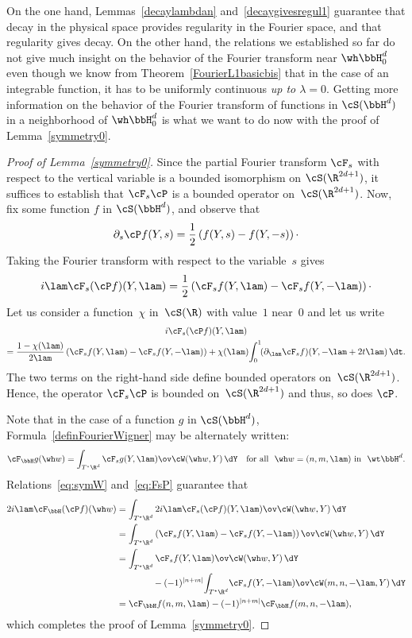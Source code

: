 On the one hand, Lemmas~\ref{decaylambdan} and~\ref{decaygivesregul1} guarantee that decay in the physical space provides regularity in the Fourier space, and that regularity gives decay. On the other hand, the relations we established so far do not give much insight on the behavior of the Fourier transform near $\wh\bbH_0^d$ even though we know from Theorem~\ref{FourierL1basicbis} that in the case of an integrable function, it has to be uniformly continuous \emph{up to $\lambda=0$}. Getting more information on the behavior of the Fourier transform of functions in $\cS(\bbH^d)$ in a neighborhood of $\wh\bbH_0^d$ is what we want to do now with the proof of Lemma~\ref{symmetry0}.

\begin{proof}[Proof of Lemma~\ref{symmetry0}]
Since the partial Fourier transform $\cF_s$ with respect to the vertical variable is a bounded isomorphism on $\cS(\R^{2d+1})$, it suffices to establish that $\cF_s\cP$ is a bounded operator on~$\cS(\R^{2d+1})$. Now, fix some function $f$ in $\cS(\bbH^d)$, and observe that
\[
\partial_s \cP f (Y,s) = \frac 12 \left(f(Y,s) -f(Y,-s)\right)\cdotp
\]
Taking the Fourier transform with respect to the variable~$s$ gives
\begin{equation}\label{eq:FsP}
i\lam \cF_s (\cP f)(Y,\lam) = \frac 12 \left(\cF_sf(Y,\lam) -\cF_sf(Y,-\lam)\right)\cdotp
\end{equation}
Let us consider a function~$\chi$ in~$\cS(\R)$ with value~$1$ near~$0$ and let us write
\begin{multline*}
i \cF_s (\cP f)(Y,\lam)\\ = \frac {1-\chi(\lam)} {2\lam} \left(\cF_sf(Y,\lam) -\cF_sf(Y,-\lam)\right) +\chi(\lam)\! \int_0^1 \!(\partial_\lam\cF_sf) (Y, -\lam+2t\lam)\,\dt.
\end{multline*}
The two terms on the right-hand side define bounded operators on~$\cS(\R^{2d+1})$. Hence, the operator $\cF_s\cP$ is bounded on~$\cS(\R^{2d+1})$ and thus, so does $\cP$.

Note that in the case of a function $g$ in $\cS(\bbH^d)$, Formula~\eqref{definFourierWigner} may be alternately written:
\[
\cF_\bbH g(\wh w)=\int_{T^\star\R^d} \cF_sg(Y,\lam)\ov\cW(\wh w,Y)\,\dY\quad\hbox{for all }\ \wh w=(n,m,\lam)
\hbox{ in }\ \wt\bbH^d.
\]
Relations~\eqref{eq:symW} and~\eqref{eq:FsP} guarantee that
\[
\begin{aligned}
2 i\lam \cF_\bbH (\cP f)(\wh w) &= \int_{T^\star\R^d}2i\lam \cF_s(\cP f)(Y,\lam)\ov\cW(\wh w,Y)\,\dY\\
&= \int_{T^\star\R^d}\left(\cF_sf(Y,\lam)-\cF_sf(Y,-\lam)\right)\ov\cW(\wh w,Y)\,\dY\\
&= \int_{T^\star\R^d}\cF_sf(Y,\lam)\ov\cW(\wh w,Y)\,\dY\\
&\qquad\qquad {} -(-1)^{|n+m|} \!\int_{T^\star\R^d}\!\cF_sf(Y,-\lam)\ov\cW(m,n,-\lam, Y)\,\dY\\
&=\cF_\bbH f(n,m,\lam)- (-1)^{|n+m|} \cF_\bbH f (m,n,-\lam),
\end{aligned}
\]
which completes the proof of Lemma~\ref{symmetry0}.
\end{proof}

